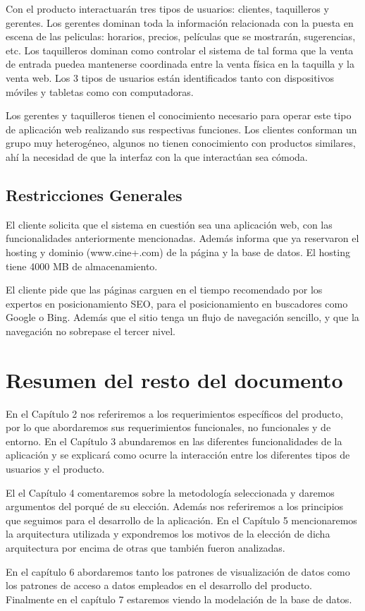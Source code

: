 Con el producto interactuarán tres tipos de usuarios: clientes, taquilleros y gerentes. Los gerentes dominan toda la información relacionada con la puesta en escena de las peliculas: horarios, precios, películas que se mostrarán, sugerencias, etc. Los taquilleros dominan como controlar el sistema de tal forma que la venta de entrada puedea mantenerse coordinada entre la venta física en la taquilla y la venta web. Los 3 tipos de usuarios están identificados tanto con dispositivos móviles y tabletas como con computadoras.

Los gerentes y taquilleros tienen el conocimiento necesario para operar este tipo de aplicación web realizando sus respectivas funciones. Los clientes conforman un grupo muy heterogéneo, algunos no tienen conocimiento con productos similares, ahí la necesidad de que la interfaz con la que interactúan sea cómoda.

\subsection{Restricciones Generales}

El cliente solicita que el sistema en cuestión sea una aplicación web, con las funcionalidades anteriormente mencionadas. Además informa que ya reservaron el hosting y dominio (www.cine+.com) de la página y la base de datos. El hosting tiene 4000 MB de almacenamiento.

El cliente pide que las páginas carguen en el tiempo recomendado por los expertos en posicionamiento SEO, para el posicionamiento en buscadores como Google o Bing. Además que el sitio tenga un flujo de navegación sencillo, y que la navegación no sobrepase el tercer nivel.

\section{Resumen del resto del documento}

En el Cap\'itulo 2 nos referiremos a los requerimientos espec\'ificos del producto, por lo que abordaremos sus requerimientos funcionales, no funcionales y de entorno. En el Cap\'itulo 3 abundaremos en las diferentes funcionalidades de la aplicaci\'on y se explicar\'a como ocurre la interacci\'on entre los diferentes tipos de usuarios y el producto.

El el Cap\'itulo 4 comentaremos sobre la metodolog\'ia seleccionada y daremos argumentos del porqu\'e de su elecci\'on. Adem\'as nos referiremos a los principios que seguimos para el desarrollo de la aplicaci\'on. En el Cap\'itulo 5 mencionaremos la arquitectura utilizada y expondremos los motivos de la elecci\'on de dicha arquitectura por encima de otras que tambi\'en fueron analizadas.

En el cap\'itulo 6 abordaremos tanto los patrones de visualizaci\'on de datos como los patrones de acceso a datos empleados en el desarrollo del producto. Finalmente en el cap\'itulo 7 estaremos viendo la modelaci\'on de la base de datos.